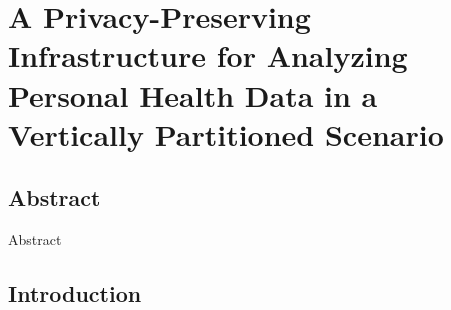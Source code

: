 \chapter{A Privacy-Preserving Infrastructure for Analyzing Personal Health Data in a Vertically Partitioned Scenario}

\clearpage

\begin{refsection}
\section*{Abstract}Abstract
\section{Introduction}

\cleardoublepage

\end{refsection}